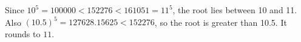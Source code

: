 Since $10^5=100000<152276<161051=11^5$, the root lies between 10 and 11. Also $(10.5)^5=127628.15625<152276$, so the root is greater than 10.5. It rounds to $\boxed{11}$.
